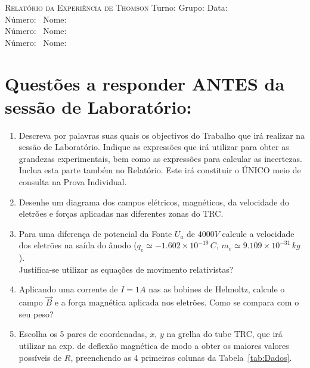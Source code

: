\documentclass[a4paper,12pt]{article}  %
\author{Prof. Bernardo B. Carvalho}
\date{ Outubro 2014}
\newcommand{\HRule}{\rule{\linewidth}{0.5mm}}
\begin{document}
 



{  \sf  \textsc{Relatório da Experiência de Thomson}} %
Turno:\underline{\makebox[0.7cm][l]{~}} Grupo:\underline{\makebox[0.7cm][l]{~}} Data:\underline{\makebox[2cm][l]{~}}\\
\noindent Número:~\underline{\makebox[2cm][r]{~}} Nome:~\underline{\makebox[10cm][r]{~}} \\
\noindent Número:~\underline{\makebox[2cm][r]{~}} Nome:~\underline{\makebox[10cm][r]{~}} \\
\noindent Número:~\underline{\makebox[2cm][r]{~}} Nome:~\underline{\makebox[10cm][r]{~}} 


\section{\sf Questões a responder ANTES da sessão de Laboratório:}
\begin{enumerate}
\item Descreva por palavras suas quais os objectivos do Trabalho que irá realizar na sessão de Laboratório. Indique as expressões que irá utilizar para obter as grandezas experimentais, bem como as expressões para calcular as incertezas. Inclua esta parte também no Relatório. Este irá constituir o ÚNICO meio de consulta na Prova Individual.
\item Desenhe um diagrama dos campos elétricos, magnéticos, da velocidade do eletrões e forças aplicadas nas diferentes zonas do TRC.
\item Para uma diferença de potencial da Fonte $U_a$  de $4000 V$ calcule a velocidade dos eletrões na saída do ânodo ($q_e \simeq  −1.602×10^{−19}\, C$, $m_e\simeq 9.109×10^{−31}\, kg$). \\
Justifica-se utilizar as equações de movimento relativistas?
\item Aplicando uma corrente de $I= 1A$ nas as bobines de Helmoltz, calcule o campo $\vec{B}$ e a força magnética aplicada nos eletrões. Como se compara com o seu peso? 
\item Escolha os 5 pares de coordenadas, $x,\, y$ na grelha  do tube TRC,  que irá utilizar na exp. de deflexão magnética de modo a obter os maiores valores possíveis de $R$, preenchendo as 4 primeiras colunas da Tabela~\ref{tab:Dados}.
\end{enumerate}
\end{document}
